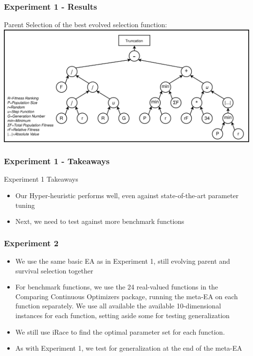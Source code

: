 \documentclass{beamer}
\begin{document}
	\begin{frame}
		\frametitle{Experiment 1 - Results}
		Parent Selection of the best evolved selection function:
		\includegraphics[width=\textwidth]{experiment1Result}
	\end{frame} 
	
	\begin{frame}
		\frametitle{Experiment 1 - Takeaways}
		Experiment 1 Takeaways
		\begin{itemize}
			 \item<1-|alert@1> Our Hyper-heuristic performs well, even against state-of-the-art parameter tuning
			 \item<2-|alert@2> Next, we need to test against more benchmark functions
		\end{itemize}
	\end{frame} 		
 

	\begin{frame}
		\frametitle{Experiment 2}
		
		\begin{itemize}
			 \item<1-|alert@1> We use the same basic EA as in Experiment 1, still evolving parent and survival selection together
			 \item<2-|alert@2> For benchmark functions, we use the 24 real-valued functions in the Comparing Continuous Optimizers package, running the meta-EA on each function separately. We use all available the available 10-dimensional instances for each function, setting aside some for testing generalization
			 \item<3-|alert@3> We still use iRace to find the optimal parameter set for each function.
			 \item<4-|alert@4> As with Experiment 1, we test for generalization at the end of the meta-EA
		\end{itemize}
	\end{frame} 
	
\end{document}
